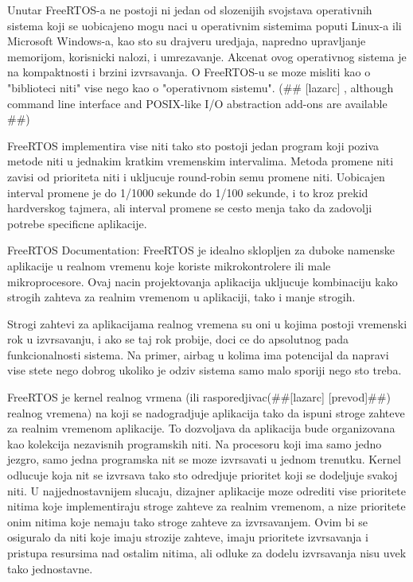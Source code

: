 \documentclass[a4paper,12pt, master]{etf}
\begin{document}
	Unutar FreeRTOS-a ne postoji ni jedan od slozenijih svojstava operativnih sistema koji se
	uobicajeno mogu naci u operativnim sistemima poputi Linux-a ili Microsoft Windows-a, kao sto su
	drajveru uredjaja, napredno upravljanje memorijom, korisnicki nalozi, i umrezavanje. Akcenat
	ovog operativnog sistema je na kompaktnosti i brzini izvrsavanja. O FreeRTOS-u se moze misliti
	kao o "biblioteci niti" vise nego kao o "operativnom sistemu". (\#\# [lazarc] , although command
	line interface and POSIX-like I/O abstraction add-ons are available \#\#)

	FreeRTOS implementira vise niti tako sto postoji jedan program koji poziva metode niti u
	jednakim kratkim vremenskim intervalima. Metoda promene niti zavisi od prioriteta niti i
	ukljucuje round-robin semu promene niti. Uobicajen interval promene je do 1/1000 sekunde do
	1/100 sekunde, i to kroz prekid hardverskog tajmera, ali interval promene se cesto menja tako
	da zadovolji potrebe specificne aplikacije.

	FreeRTOS Documentation:
	FreeRTOS je idealno sklopljen za duboke namenske aplikacije u realnom vremenu koje koriste
	mikrokontrolere ili male mikroprocesore. Ovaj nacin projektovanja aplikacija ukljucuje
	kombinaciju kako strogih zahteva za realnim vremenom u aplikaciji, tako i manje strogih.

	Strogi zahtevi za aplikacijama realnog vremena su oni u kojima postoji vremenski rok u
	izvrsavanju, i ako se taj rok probije, doci ce do apsolutnog pada funkcionalnosti sistema. Na
	primer, airbag u kolima ima potencijal da napravi vise stete nego dobrog ukoliko je odziv
	sistema samo malo sporiji nego sto treba.

	FreeRTOS je kernel realnog vrmena (ili rasporedjivac(\#\#[lazarc] [prevod]\#\#) realnog vremena) na
	koji se nadogradjuje aplikacija tako da ispuni stroge zahteve za realnim vremenom aplikacije.
	To dozvoljava da aplikacija bude organizovana kao kolekcija nezavisnih programskih niti. Na
	procesoru koji ima samo jedno jezgro, samo jedna programska nit se moze izvrsavati u jednom
	trenutku. Kernel odlucuje koja nit se izvrsava tako sto odredjuje prioritet koji se dodeljuje
	svakoj niti. U najjednostavnijem slucaju, dizajner aplikacije moze odrediti vise prioritete
	nitima koje implementiraju stroge zahteve za realnim vremenom, a nize prioritete onim nitima
	koje nemaju tako stroge zahteve za izvrsavanjem. Ovim bi se osiguralo da niti koje imaju
	strozije zahteve, imaju prioritete izvrsavanja i pristupa resursima nad ostalim nitima, ali
	odluke za dodelu izvrsavanja nisu uvek tako jednostavne.
\end{document}
